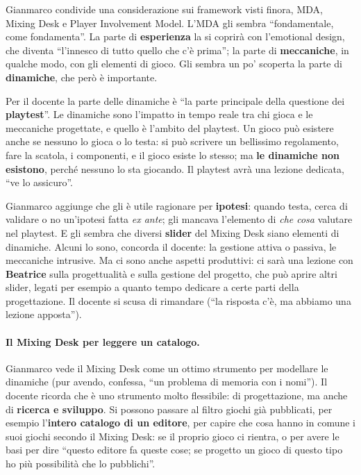 Gianmarco condivide una considerazione sui framework visti finora, MDA, Mixing Desk e
Player Involvement Model. L'MDA gli sembra ``fondamentale, come fondamenta''. La
parte di \textbf{esperienza} la si coprirà con l'emotional design, che diventa
``l'innesco di tutto quello che c'è prima''; la parte di \textbf{meccaniche}, in
qualche modo, con gli elementi di gioco. Gli sembra un po' scoperta la parte di
\textbf{dinamiche}, che però è importante.

Per il docente la parte delle dinamiche è ``la parte principale della questione dei
\textbf{playtest}''. Le dinamiche sono l'impatto in tempo reale tra chi gioca e le
meccaniche progettate, e quello è l'ambito del playtest. Un gioco può esistere anche
se nessuno lo gioca o lo testa: si può scrivere un bellissimo regolamento, fare la
scatola, i componenti, e il gioco esiste lo stesso; ma \textbf{le dinamiche non
esistono}, perché nessuno lo sta giocando. Il playtest avrà una lezione dedicata,
``ve lo assicuro''.

Gianmarco aggiunge che gli è utile ragionare per \textbf{ipotesi}: quando testa,
cerca di validare o no un'ipotesi fatta \emph{ex ante}; gli mancava l'elemento di
\emph{che cosa} valutare nel playtest. E gli sembra che diversi \textbf{slider} del
Mixing Desk siano elementi di dinamiche. Alcuni lo sono, concorda il docente: la
gestione attiva o passiva, le meccaniche intrusive. Ma ci sono anche aspetti
produttivi: ci sarà una lezione con \textbf{Beatrice} sulla progettualità e sulla
gestione del progetto, che può aprire altri slider, legati per esempio a quanto tempo
dedicare a certe parti della progettazione. Il docente si scusa di rimandare
(``la risposta c'è, ma abbiamo una lezione apposta'').

\paragraph{Il Mixing Desk per leggere un catalogo.} Gianmarco vede il Mixing Desk come
un ottimo strumento per modellare le dinamiche (pur avendo, confessa, ``un problema
di memoria con i nomi''). Il docente ricorda che è uno strumento molto flessibile:
di progettazione, ma anche di \textbf{ricerca e sviluppo}. Si possono passare al
filtro giochi già pubblicati, per esempio l'\textbf{intero catalogo di un editore},
per capire che cosa hanno in comune i suoi giochi secondo il Mixing Desk: se il
proprio gioco ci rientra, o per avere le basi per dire ``questo editore fa queste
cose; se progetto un gioco di questo tipo ho più possibilità che lo pubblichi''.

